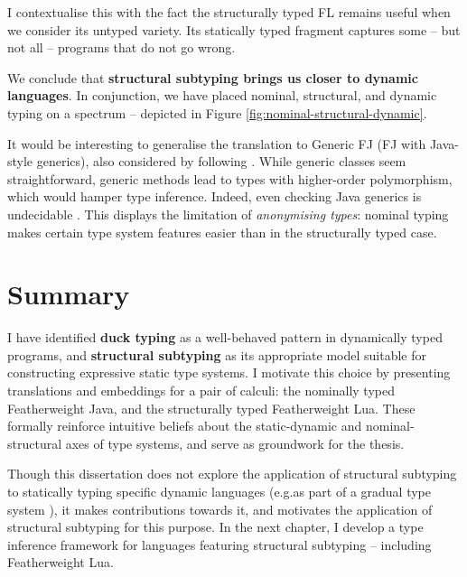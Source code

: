 I contextualise this with the fact the structurally typed FL remains useful when we consider its untyped variety. Its statically typed fragment captures some -- but not all -- programs that do not go wrong.

We conclude that \textbf{structural subtyping brings us closer to dynamic languages}. In conjunction, we have placed nominal, structural, and dynamic typing on a spectrum -- depicted in Figure \ref{fig:nominal-structural-dynamic}.

It would be interesting to generalise the translation to Generic FJ (FJ with Java-style generics), also considered by \textcite{featherweight-java} following \textcite{generic-java}. While generic classes seem straightforward, generic methods lead to types with higher-order polymorphism, which would hamper type inference. Indeed, even checking Java generics is undecidable \cite{java-generics-undecidable}. This displays the limitation of \emph{anonymising types}: nominal typing makes certain type system features easier than in the structurally typed case.

\section{Summary}

I have identified \textbf{duck typing} as a well-behaved pattern in dynamically typed programs, and \textbf{structural subtyping} as its appropriate model suitable for constructing expressive static type systems. I motivate this choice by presenting translations and embeddings for a pair of calculi: the nominally typed Featherweight Java, and the structurally typed Featherweight Lua. These formally reinforce intuitive beliefs about the static-dynamic and nominal-structural axes of type systems, and serve as groundwork for the thesis.

Though this dissertation does not explore the application of structural subtyping to statically typing specific dynamic languages (e.g.\@ as part of a gradual type system \cite{gradual-typing-for-objects}), it makes contributions towards it, and motivates the application of structural subtyping for this purpose. In the next chapter, I develop a type inference framework for languages featuring structural subtyping -- including Featherweight Lua.

